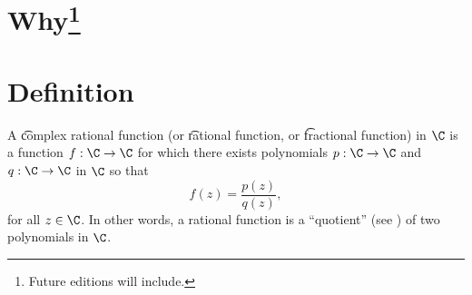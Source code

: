 

\section*{Why\footnote{Future editions will include.}}

\section*{Definition}

A \t{complex rational function} (or \t{rational function}, or \t{fractional function}) in $\C $ is a function $f: \C  \to \C $ for which there exists polynomials $p: \C  \to \C $ and $q: \C \to \C $ in $\C $ so that
\[
f(z) = \frac{p(z)}{q(z)},
\]
for all $z \in \C $.
In other words, a rational function is a ``quotient'' (see ) of two polynomials in $\C $.

\blankpage